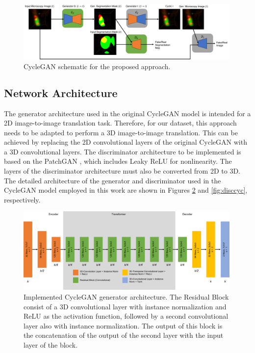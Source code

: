 \begin{figure}[!htb]
  \centering
  \includegraphics[width=0.99\textwidth]{Images/diagrama.jpg}
  \caption[CycleGAN schematic for the proposed approach.]{CycleGAN schematic for the proposed approach.}
  \label{fig:diagrama}
\end{figure}


\subsection*{Network Architecture}

The generator architecture used in the original CycleGAN model is intended for a 2D image-to-image translation task. Therefore, for our dataset, this approach needs to be adapted to perform a 3D image-to-image translation. This can be achieved by replacing the 2D convolutional layers of the original CycleGAN with a 3D convolutional layers.  The discriminator architecture to be implemented is based on the PatchGAN \cite{isola2018imagetoimage}, which includes \ac{Leaky ReLU} for nonlinearity. The layers of the discriminator architecture must also be converted from 2D to 3D. The detailed architecture of the generator and discriminator used in the CycleGAN model employed in this work are shown in Figures \ref{fig:gencyc} and \ref{fig:disccyc}, respectively.

\begin{figure}[!htb]
  \centering
  \includegraphics[width=0.99\textwidth]{Images/generator_cyclegan.jpg}
  \caption{Implemented CycleGAN generator architecture. The Residual Block consist of a \ac{3D} convolutional layer with instance normalization and \ac{ReLU} as the activation function, followed by a second convolutional layer also with instance normalization.  The output of this block is the concatenation of the output of the second layer with the input layer of the block.}
  \label{fig:gencyc}
\end{figure}

